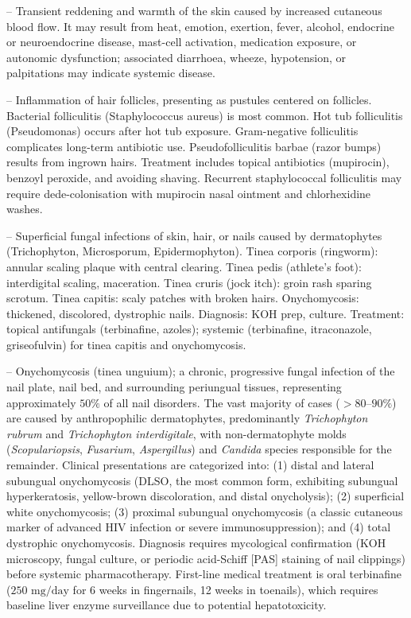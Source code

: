 -- Transient reddening and warmth of the skin caused by increased cutaneous blood flow. It may result from heat, emotion, exertion, fever, alcohol, endocrine or neuroendocrine disease, mast-cell activation, medication exposure, or autonomic dysfunction; associated diarrhoea, wheeze, hypotension, or palpitations may indicate systemic disease.

-- Inflammation of hair follicles, presenting as pustules centered on follicles. Bacterial folliculitis (Staphylococcus aureus) is most common. Hot tub folliculitis (Pseudomonas) occurs after hot tub exposure. Gram-negative folliculitis complicates long-term antibiotic use. Pseudofolliculitis barbae (razor bumps) results from ingrown hairs. Treatment includes topical antibiotics (mupirocin), benzoyl peroxide, and avoiding shaving. Recurrent staphylococcal folliculitis may require dede-colonisation with mupirocin nasal ointment and chlorhexidine washes.

-- Superficial fungal infections of skin, hair, or nails caused by dermatophytes (Trichophyton, Microsporum, Epidermophyton). Tinea corporis (ringworm): annular scaling plaque with central clearing. Tinea pedis (athlete's foot): interdigital scaling, maceration. Tinea cruris (jock itch): groin rash sparing scrotum. Tinea capitis: scaly patches with broken hairs. Onychomycosis: thickened, discolored, dystrophic nails. Diagnosis: KOH prep, culture. Treatment: topical antifungals (terbinafine, azoles); systemic (terbinafine, itraconazole, griseofulvin) for tinea capitis and onychomycosis.

-- Onychomycosis (tinea unguium); a chronic, progressive fungal infection of the nail plate, nail bed, and surrounding periungual tissues, representing approximately $50\%$ of all nail disorders. The vast majority of cases ($>80\text{--}90\%$) are caused by anthropophilic dermatophytes, predominantly \textit{Trichophyton rubrum} and \textit{Trichophyton interdigitale}, with non-dermatophyte molds (\textit{Scopulariopsis}, \textit{Fusarium}, \textit{Aspergillus}) and \textit{Candida} species responsible for the remainder. Clinical presentations are categorized into: (1) distal and lateral subungual onychomycosis (DLSO, the most common form, exhibiting subungual hyperkeratosis, yellow-brown discoloration, and distal onycholysis); (2) superficial white onychomycosis; (3) proximal subungual onychomycosis (a classic cutaneous marker of advanced HIV infection or severe immunosuppression); and (4) total dystrophic onychomycosis. Diagnosis requires mycological confirmation (KOH microscopy, fungal culture, or periodic acid-Schiff [PAS] staining of nail clippings) before systemic pharmacotherapy. First-line medical treatment is oral terbinafine ($250\text{ mg/day}$ for 6 weeks in fingernails, 12 weeks in toenails), which requires baseline liver enzyme surveillance due to potential hepatotoxicity.

